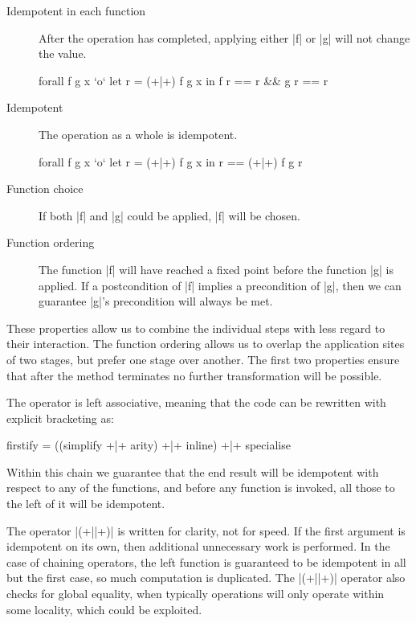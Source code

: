 \documentclass[preprint]{sigplanconf}
\begin{document}
\begin{description}
\item[Idempotent in each function] After the operation has completed, applying either |f| or |g| will not change the value.

\begin{code}
forall f g x `o` let r = (+|+) f g x in f r == r && g r == r
\end{code}

\item[Idempotent] The operation as a whole is idempotent.

\begin{code}
forall f g x `o` let r = (+|+) f g x in r == (+|+) f g r
\end{code}

\item[Function choice] If both |f| and |g| could be applied, |f| will be chosen.

\item[Function ordering] The function |f| will have reached a fixed point before the function |g| is applied. If a postcondition of |f| implies a precondition of |g|, then we can guarantee |g|'s precondition will always be met.
\end{description}

These properties allow us to combine the individual steps with less regard to their interaction. The function ordering allows us to overlap the application sites of two stages, but prefer one stage over another. The first two properties ensure that after the method terminates no further transformation will be possible.

The operator is left associative, meaning that the code can be rewritten with explicit bracketing as:

\begin{code}
firstify = ((simplify +|+ arity) +|+ inline) +|+ specialise
\end{code}

Within this chain we guarantee that the end result will be idempotent with respect to any of the functions, and before any function is invoked, all those to the left of it will be idempotent.

The operator |(+||+)| is written for clarity, not for speed. If the first argument is idempotent on its own, then additional unnecessary work is performed. In the case of chaining operators, the left function is guaranteed to be idempotent in all but the first case, so much computation is duplicated. The |(+||+)| operator also checks for global equality, when typically operations will only operate within some locality, which could be exploited.
\end{document}
